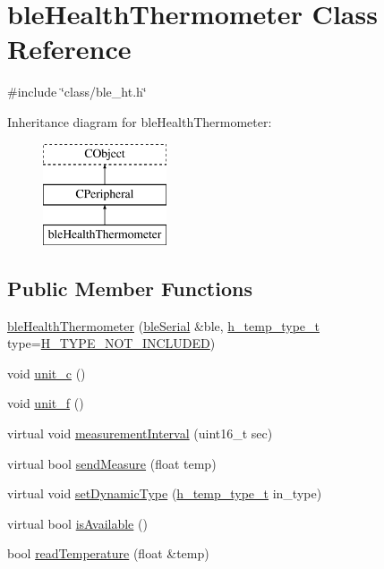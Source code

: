 \hypertarget{classble_health_thermometer}{\section{ble\-Health\-Thermometer Class Reference}
\label{classble_health_thermometer}
}


{\ttfamily \#include \char`\"{}class/ble\-\_\-ht.\-h\char`\"{}}

Inheritance diagram for ble\-Health\-Thermometer\-:\begin{figure}[H]
\begin{center}
\leavevmode
\includegraphics[height=3.000000cm]{d9/d26/classble_health_thermometer}
\end{center}
\end{figure}
\subsection*{Public Member Functions}
\begin{DoxyCompactItemize}
\item 
\hyperlink{classble_health_thermometer_a92480888b6ed2b0fe354cc4a5404a63d}{ble\-Health\-Thermometer} (\hyperlink{classble_serial}{ble\-Serial} \&ble, \hyperlink{group___b_l_e_ga7fa712ec2096ff24507538b50e2f51e0}{h\-\_\-temp\-\_\-type\-\_\-t} type=\hyperlink{group___b_l_e_gga7fa712ec2096ff24507538b50e2f51e0aedd58ca967667d8b42f7eef6080719e0}{H\-\_\-\-T\-Y\-P\-E\-\_\-\-N\-O\-T\-\_\-\-I\-N\-C\-L\-U\-D\-E\-D})
\item 
void \hyperlink{classble_health_thermometer_a0f00efd291e5b91fef286071d3441172}{unit\-\_\-c} ()
\item 
void \hyperlink{classble_health_thermometer_aafe2468db4033c905394da1d58c83620}{unit\-\_\-f} ()
\item 
virtual void \hyperlink{classble_health_thermometer_acd9cde127f632f06615382b3d03299fd}{measurement\-Interval} (uint16\-\_\-t sec)
\item 
virtual bool \hyperlink{classble_health_thermometer_a09413d493022f3c52dfd269cf01bacd1}{send\-Measure} (float temp)
\item 
virtual void \hyperlink{classble_health_thermometer_a32d3cdc9efb78bed4a5ed728cdb93846}{set\-Dynamic\-Type} (\hyperlink{group___b_l_e_ga7fa712ec2096ff24507538b50e2f51e0}{h\-\_\-temp\-\_\-type\-\_\-t} in\-\_\-type)
\item 
virtual bool \hyperlink{classble_health_thermometer_a39b5e5ae997a87c7393e363cb540c421}{is\-Available} ()
\item 
bool \hyperlink{classble_health_thermometer_a8d54f2c7e49f12ca5846e55dcab0ab3b}{read\-Temperature} (float \&temp)
\end{DoxyCompactItemize}


